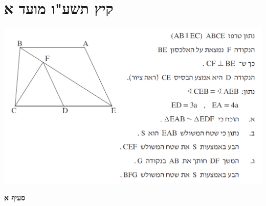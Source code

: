 \documentclass[12pt,a4paper]{article}
\begin{document}


\newpage

\section{קיץ תשע"ו מועד א}

\begin{center}
\includegraphics[width=\textwidth]{summer-2016a-4}
\end{center}

\textbf{סעיף א}
\end{document}
